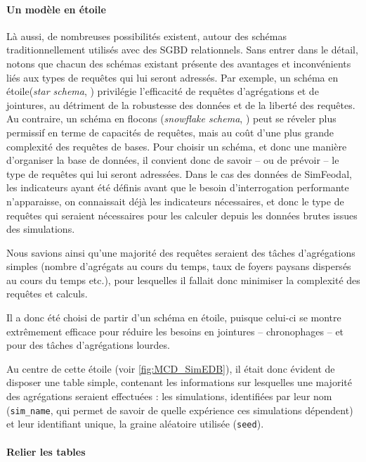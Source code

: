 			\paragraph*{Un modèle \og en étoile\fg{}}
			
		Là aussi, de nombreuses possibilités existent, autour des schémas traditionnellement utilisés avec des SGBD relationnels.
		Sans entrer dans le détail, notons que chacun des schémas existant présente des avantages et inconvénients liés aux types de requêtes qui lui seront adressés.
		Par exemple, un schéma \og en étoile\fg{}(\textit{star schema}, \autocite{noauthor_star_2018}) privilégie l'efficacité de requêtes d'agrégations et de jointures, au détriment de la robustesse des données et de la liberté des requêtes.
		Au contraire, un schéma \og en flocons\fg{} (\textit{snowflake schema}, \autocite{noauthor_snowflake_2018}) peut se réveler plus permissif en terme de capacités de requêtes, mais au coût d'une plus grande complexité des requêtes de bases.
		Pour choisir un schéma, et donc une manière d'organiser la base de données, il convient donc de savoir -- ou de prévoir -- le type de requêtes qui lui seront adressées.
		Dans le cas des données de SimFeodal, les indicateurs ayant été définis avant que le besoin d'interrogation performante n'apparaisse, on connaissait déjà les indicateurs nécessaires, et donc le type de requêtes qui seraient nécessaires pour les calculer depuis les données brutes issues des simulations.
		
		Nous savions ainsi qu'une majorité des requêtes seraient des tâches d'agrégations simples (nombre d'agrégats au cours du temps, taux de foyers paysans dispersés au cours du temps etc.), pour lesquelles il fallait donc minimiser la complexité des requêtes et calculs.
		
		Il a donc été choisi de partir d'un schéma en étoile, puisque celui-ci se montre extrêmement efficace pour réduire les besoins en jointures -- chronophages -- et pour des tâches d'agrégations lourdes.
		
		Au centre de cette étoile (voir \cref{fig:MCD_SimEDB}), il était donc évident de disposer une table simple, contenant les informations sur lesquelles une majorité des agrégations seraient effectuées : les simulations, identifiées par leur nom (\texttt{sim\_name}, qui permet de savoir de quelle expérience ces simulations dépendent) et leur identifiant unique, la graine aléatoire utilisée (\texttt{seed}).	
			
		\paragraph*{Relier les tables}
			
